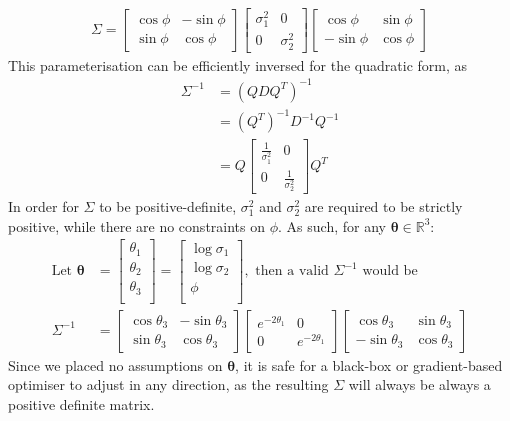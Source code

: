 \documentclass[a4paper, 12pt]{report}
\begin{document}
\begin{align}
\Sigma = \begin{bmatrix}
	\cos \phi & -\sin \phi \\ \sin\phi & \cos\phi
\end{bmatrix}\begin{bmatrix}
	 \sigma_1^2 & 0\\ 0 &  \sigma_2^2
\end{bmatrix} \begin{bmatrix}
	\cos \phi & \sin \phi \\ -\sin\phi & \cos\phi
\end{bmatrix}
\end{align}
This parameterisation can be efficiently inversed for the quadratic form, as \begin{align}
	\Sigma^{-1} &= (QDQ^T)^{-1}\\
	&= (Q^T)^{-1} D^{-1} Q^{-1}\\
	&= Q\begin{bmatrix}
	 \frac{1}{\sigma_1^2} & 0\\ 0 &  \frac{1}{\sigma_2^2}
\end{bmatrix}Q^T
\end{align}
In order for $\Sigma$ to be positive-definite, $\sigma_1^2$ and $\sigma_2^2$ are required to be strictly positive, while there are no constraints on $\phi$. As such, for any $\boldsymbol{\theta}\in\mathbb{R}^3$:
\begin{align}
\textrm{Let }\boldsymbol{\theta}&=\begin{bmatrix}
	\theta_1\\
	\theta_2\\
	\theta_3\\
\end{bmatrix}=\begin{bmatrix}
	\log\sigma_1 \\
	\log\sigma_2\\
	\phi\\
\end{bmatrix}, \textrm{ then a valid $\Sigma^{-1}$ would be} \\
\Sigma^{-1} &= \begin{bmatrix}
	\cos \theta_3 & -\sin \theta_3 \\ \sin\theta_3 & \cos\theta_3
\end{bmatrix}\begin{bmatrix}
	 e^{-2\theta_1} & 0\\ 0 &  e^{-2\theta_1}
\end{bmatrix} \begin{bmatrix}
	\cos \theta_3 & \sin \theta_3 \\ -\sin\theta_3 & \cos\theta_3
\end{bmatrix}
\end{align}
Since we placed no assumptions on $\boldsymbol{\theta}$, it is safe for a black-box or gradient-based optimiser to adjust in any direction, as the resulting $\Sigma$ will always be always a positive definite matrix.
\end{document}
